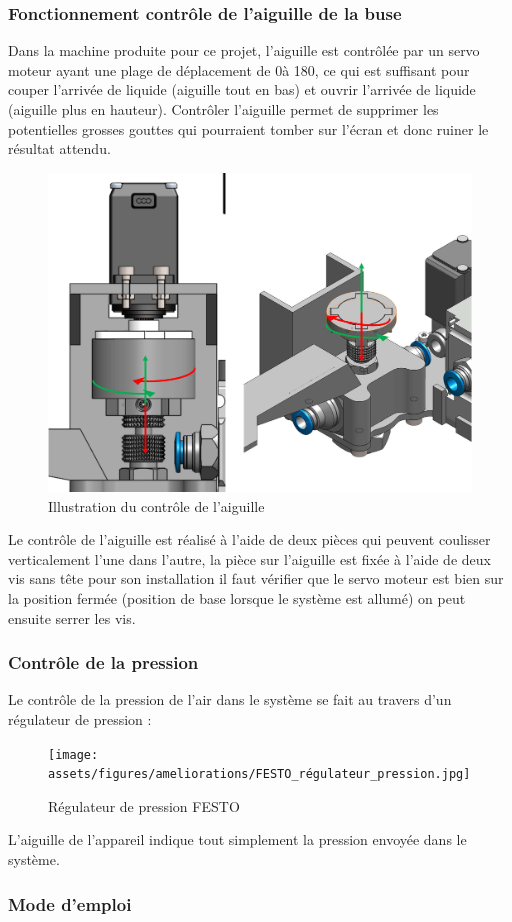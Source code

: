 \newpage
\subsubsection{Fonctionnement contrôle de l'aiguille de la buse}
Dans la machine produite pour ce projet, l'aiguille est contrôlée par un servo moteur ayant une plage de déplacement de 0\textdegree à 180\textdegree, ce qui est suffisant
pour couper l'arrivée de liquide (aiguille tout en bas) et ouvrir l'arrivée de liquide (aiguille plus en hauteur). Contrôler l'aiguille permet de supprimer les potentielles
grosses gouttes qui pourraient tomber sur l'écran et donc ruiner le résultat attendu.
\begin{figure}[H]
    \centering
    \includegraphics[width = 1\textwidth]{assets/figures/ameliorations/aiguille_haut_bas.jpg}
    \caption{Illustration du contrôle de l'aiguille}
\end{figure}
Le contrôle de l'aiguille est réalisé à l'aide de deux pièces qui peuvent coulisser verticalement l'une dans l'autre, la pièce sur l'aiguille est fixée à l'aide de deux vis sans tête
pour son installation il faut vérifier que le servo moteur est bien sur la position fermée (position de base lorsque le système est allumé) on peut ensuite serrer les vis.

\newpage
\subsubsection{Contrôle de la pression}
Le contrôle de la pression de l'air dans le système se fait au travers d'un régulateur de pression :
\begin{figure}[H]
    \centering
    \texttt{[image: assets/figures/ameliorations/FESTO\_régulateur\_pression.jpg]}
    \caption{Régulateur de pression FESTO}
\end{figure}
L'aiguille de l'appareil indique tout simplement la pression envoyée dans le système.
\newpage
\subsubsection{Mode d'emploi}

